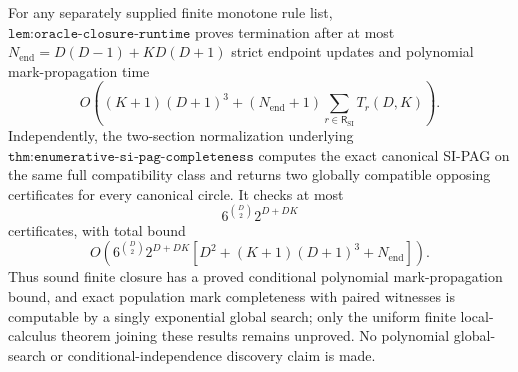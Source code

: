 For any separately supplied finite monotone rule list, \(\texttt{lem:oracle-closure-runtime}\) proves termination after at most \(N_{\mathrm{end}}=D(D-1)+KD(D+1)\) strict endpoint updates and polynomial mark-propagation time \[O\!\left((K+1)(D+1)^3+(N_{\mathrm{end}}+1)\sum_{r\in\mathsf R_{\mathrm{SI}}}T_r(D,K)\right).\] Independently, the two-section normalization underlying \(\texttt{thm:enumerative-si-pag-completeness}\) computes the exact canonical SI-PAG on the same full compatibility class and returns two globally compatible opposing certificates for every canonical circle. It checks at most \[6^{\binom D2}2^{D+DK}\] certificates, with total bound \[O\!\left(6^{\binom D2}2^{D+DK}\left[D^2+(K+1)(D+1)^3+N_{\mathrm{end}}\right]\right).\] Thus sound finite closure has a proved conditional polynomial mark-propagation bound, and exact population mark completeness with paired witnesses is computable by a singly exponential global search; only the uniform finite local-calculus theorem joining these results remains unproved. No polynomial global-search or conditional-independence discovery claim is made.